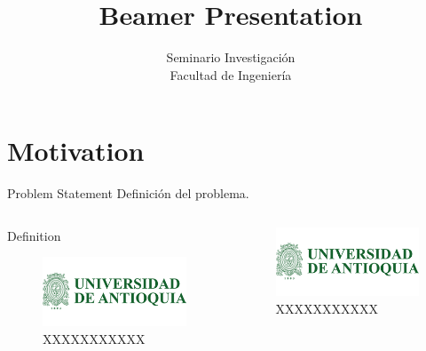 \documentclass{beamer}
\title{Beamer Presentation}
\author{Seminario Investigación\\Facultad de Ingeniería}
\begin{document}
	
	\frame[plain]{\titlepage}
	
	\section{Motivation}
	
	\begin{frame}{Problem Statement}
Definición del problema.


	
	\begin{columns}
		\begin{column}{0.45\linewidth}
			\begin{block}{Definition}
				\begin{figure}
				\includegraphics[width=0.5\linewidth]{logos/logoUdeA}
				\caption{XXXXXXXXXXX}
			\end{figure}
			\end{block}
		\end{column}
	\begin{column}{0.45\linewidth}
		\begin{figure}
			\includegraphics[width=0.5\linewidth]{logos/logoUdeA}
			\caption{XXXXXXXXXXX}
		\end{figure}
	\end{column}
	\end{columns}


\end{frame}
\end{document}
